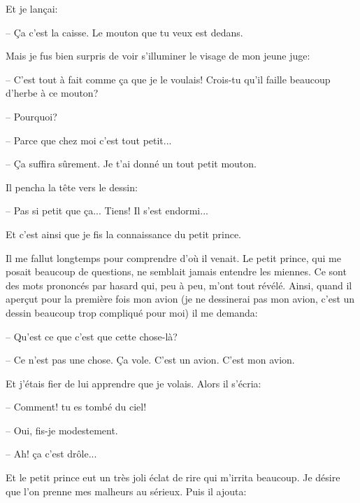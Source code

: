 \documentclass[a4paper]{report}
\begin{document}

Et je lançai:

-- Ça c'est la caisse. Le mouton que tu veux est dedans.

Mais je fus bien surpris de voir s'illuminer le visage de mon jeune juge:

-- C'est tout à fait comme ça que je le voulais! Crois-tu qu'il faille beaucoup d'herbe à ce mouton?

-- Pourquoi?

-- Parce que chez moi c'est tout petit...

-- Ça suffira sûrement. Je t'ai donné un tout petit mouton.

Il pencha la tête vers le dessin:

-- Pas si petit que ça... Tiens! Il s'est endormi...

Et c'est ainsi que je fis la connaissance du petit prince.

\parachapter[III]{} %
Il me fallut longtemps pour comprendre d'où il venait. Le petit prince, qui me posait beaucoup de questions, ne semblait jamais entendre les miennes. Ce sont des mots prononcés par hasard qui, peu à peu, m'ont tout révélé. Ainsi, quand il aperçut pour la première fois mon avion (je ne dessinerai pas mon avion, c'est un dessin beaucoup trop compliqué pour moi) il me demanda:

-- Qu'est ce que c'est que cette chose-là?

-- Ce n'est pas une chose. Ça vole. C'est un avion. C'est mon avion.

Et j'étais fier de lui apprendre que je volais. Alors il s'écria:

-- Comment! tu es tombé du ciel!

-- Oui, fis-je modestement.

-- Ah! ça c'est drôle...

Et le petit prince eut un très joli éclat de rire qui m'irrita beaucoup. Je désire que l'on prenne mes malheurs au sérieux. Puis il ajouta:
\end{document}
